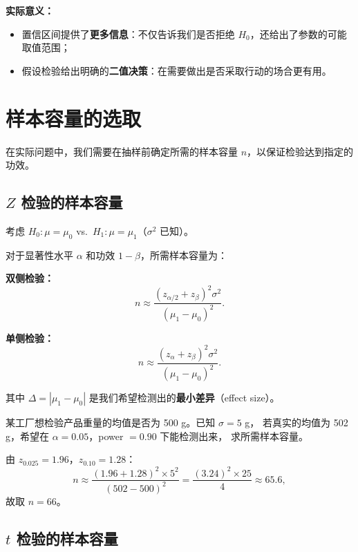 \textbf{实际意义：}
\begin{itemize}
    \item 置信区间提供了\textbf{更多信息}：不仅告诉我们是否拒绝 $H_0$，还给出了参数的可能取值范围；
    \item 假设检验给出明确的\textbf{二值决策}：在需要做出是否采取行动的场合更有用。
\end{itemize}

\section{样本容量的选取}

在实际问题中，我们需要在抽样前确定所需的样本容量 $n$，以保证检验达到指定的功效。

\subsection{$Z$ 检验的样本容量}

考虑 $H_0: \mu = \mu_0$ vs.\ $H_1: \mu = \mu_1$（$\sigma^2$ 已知）。

对于显著性水平 $\alpha$ 和功效 $1-\beta$，所需样本容量为：

\textbf{双侧检验：}
\begin{equation}
    \boxed{n \approx \frac{(z_{\alpha/2} + z_{\beta})^2 \sigma^2}{(\mu_1 - \mu_0)^2}}.
\end{equation}

\textbf{单侧检验：}
\begin{equation}
    \boxed{n \approx \frac{(z_{\alpha} + z_{\beta})^2 \sigma^2}{(\mu_1 - \mu_0)^2}}.
\end{equation}

其中 $\Delta = |\mu_1 - \mu_0|$ 是我们希望检测出的\textbf{最小差异}（effect size）。

\begin{example}
某工厂想检验产品重量的均值是否为 500 g。已知 $\sigma = 5$ g，
若真实的均值为 502 g，希望在 $\alpha = 0.05$，power $= 0.90$ 下能检测出来，
求所需样本容量。

由 $z_{0.025} = 1.96$，$z_{0.10} = 1.28$：
\begin{equation}
    n \approx \frac{(1.96 + 1.28)^2 \times 5^2}{(502-500)^2}
       = \frac{(3.24)^2 \times 25}{4} \approx 65.6,
\end{equation}
故取 $n = 66$。
\end{example}

\subsection{$t$ 检验的样本容量}

